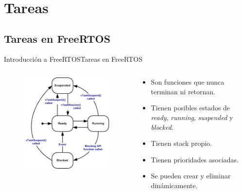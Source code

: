\documentclass[aspectratio=169, xcolor=dvipsnames]{beamer}
\begin{document}
\section{Tareas}
\subsection{Tareas en FreeRTOS}
\begin{frame}{Introducción a FreeRTOS}{Tareas en FreeRTOS}
\begin{columns}
\begin{column}{0.5\textwidth}
\begin{figure}
\centering
\includegraphics[width=0.8\linewidth]{resources/images/task_states.png}
\end{figure}
\end{column}
\begin{column}{0.5\textwidth}
\begin{itemize}
    \item Son funciones que nunca terminan ni retornan.
    \item Tienen posibles estados de \textit{ready}, \textit{running}, \textit{suspended} y \textit{blocked}.
    \item Tienen stack propio.
    \item Tienen prioridades asociadas.
    \item Se pueden crear y eliminar dinámicamente.
\end{itemize}
\end{column}
\end{columns}
\end{frame}
\end{document}

